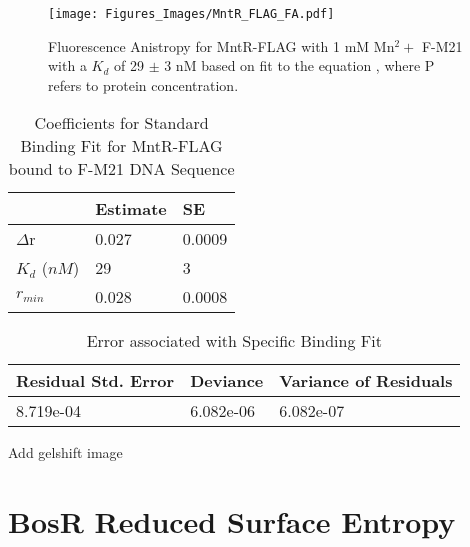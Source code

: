 \documentclass[12pt,twoside]{reedthesis}
\begin{document}
       	\begin{figure}[h!tbp]
       		\centering
       		\texttt{[image: Figures\_Images/MntR\_FLAG\_FA.pdf]}
       		\caption[Determining DNA Activity of MntR-FLAG by Fluorescence Anistropy]{Fluorescence Anistropy for MntR-FLAG with 1 mM Mn$^2+$ F-M21 with a $K_{d}$ of 29 $\pm$ 3 nM based on fit to the equation \FAstdfit , where P refers to protein concentration.}
       		\label{MntRFLAGFA}
       	\end{figure}
      
 \begin{table}[ht]
 	\caption{Coefficients for Standard Binding Fit for MntR-FLAG bound to F-M21 DNA Sequence} 
 	\label{MntRFLAGCoef}
 	\begin{tabularx}{3.0in}{|X|X|X|}
 		\hline
 		\textbf{ } & \textbf{Estimate} & \textbf{SE} \\ 
 		\hline
 		$\Delta$r & 0.027 & 0.0009 \\ 
 		\hline
 		$K_{d}$ ($nM$) &  29  &  3  \\ 
 		\hline
 		$r_{min}$ & 0.028 & 0.0008 \\ 
 		\hline
 	\end{tabularx}
 \end{table}\begin{table}[ht]
 \centering
 \parbox{5.0in}{\caption{Error associated with Specific Binding Fit}} 
 \begin{tabularx}{3.0in}{|X|X|X|}
 	\hline
 	\textbf{Residual Std. Error} & \textbf{Deviance} & \textbf{Variance of Residuals} \\ 
 	\hline
 	8.719e-04 & 6.082e-06 & 6.082e-07 \\ 
 	\hline
 \end{tabularx}
\end{table}


Add gelshift image 

\clearpage

   \section*{BosR Reduced Surface Entropy}
   
\end{document}
